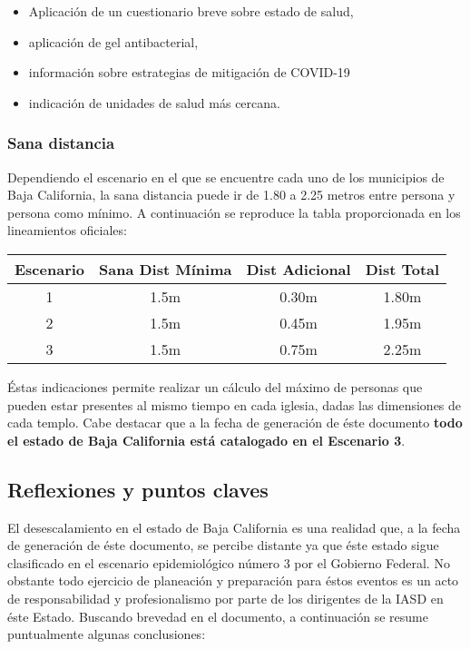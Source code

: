\documentclass[]{article}
\providecommand{\tightlist}{%
  \setlength{\itemsep}{0pt}\setlength{\parskip}{0pt}}
\begin{document}
\begin{itemize}
\tightlist
\item
  Aplicación de un cuestionario breve sobre estado de salud,
\item
  aplicación de gel antibacterial,
\item
  información sobre estrategias de mitigación de COVID-19
\item
  indicación de unidades de salud más cercana.
\end{itemize}

\subsubsection{Sana distancia}\label{sana-distancia}

Dependiendo el escenario en el que se encuentre cada uno de los
municipios de Baja California, la sana distancia puede ir de 1.80 a 2.25
metros entre persona y persona como mínimo. A continuación se reproduce
la tabla proporcionada en los lineamientos oficiales:

\begin{longtable}[]{@{}cccc@{}}
\toprule
Escenario & Sana Dist Mínima & Dist Adicional & Dist
Total\tabularnewline
\midrule
\endhead
1 & 1.5m & 0.30m & 1.80m\tabularnewline
2 & 1.5m & 0.45m & 1.95m\tabularnewline
3 & 1.5m & 0.75m & 2.25m\tabularnewline
\bottomrule
\end{longtable}

Éstas indicaciones permite realizar un cálculo del máximo de personas
que pueden estar presentes al mismo tiempo en cada iglesia, dadas las
dimensiones de cada templo. Cabe destacar que a la fecha de generación
de éste documento \textbf{todo el estado de Baja California está
catalogado en el Escenario 3}.

\subsection{Reflexiones y puntos
claves}\label{reflexiones-y-puntos-claves}

El desescalamiento en el estado de Baja California es una realidad que,
a la fecha de generación de éste documento, se percibe distante ya que
éste estado sigue clasificado en el escenario epidemiológico número 3
por el Gobierno Federal. No obstante todo ejercicio de planeación y
preparación para éstos eventos es un acto de responsabilidad y
profesionalismo por parte de los dirigentes de la IASD en éste Estado.
Buscando brevedad en el documento, a continuación se resume puntualmente
algunas conclusiones:
\end{document}
